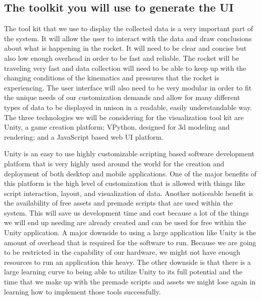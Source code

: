 \documentclass[10pt,draftclsnofoot,onecolumn]{IEEEtran}
\begin{document}
\subsection{The toolkit you will use to generate the UI}
The tool kit that we use to display the collected data is a very important part of the system. It will allow the user to interact with the data and draw conclusions about what is happening in the rocket. It will need to be clear and concise but also low enough overhead in order to be fast and reliable. The rocket will be traveling very fast and data collection will need to be able to keep up with the changing conditions of the kinematics and pressures that the rocket is experiencing. The user interface will also need to be very modular in order to fit the unique needs of our customization demands and allow for many different types of data to be displayed in unison in a readable, easily understandable way. The three technologies we will be considering for the visualization tool kit are Unity, a game creation platform; VPython, designed for 3d modeling and rendering; and a JavaScript based web UI platform. \par

Unity is an easy to use highly customizable scripting based software development platform that is very highly used around the world for the creation and deployment of both desktop and mobile applications. One of the major benefits of this platform is the high level of customization that is allowed with things like script interaction, layout, and visualization of data. Another noticeable benefit is the availability of free assets and premade scripts that are used within the system. This will save us development time and cost because a lot of the things we will end up needing are already created and can be used for free within the Unity application. A major downside to using a large application like Unity is the amount of overhead that is required for the software to run. Because we are going to be restricted in the capability of our hardware, we might not have enough resources to run an application this heavy. The other downside is that there is a large learning curve to being able to utilize Unity to its full potential and the time that we make up with the premade scripts and assets we might lose again in learning how to implement those tools successfully. \par
\end{document}
